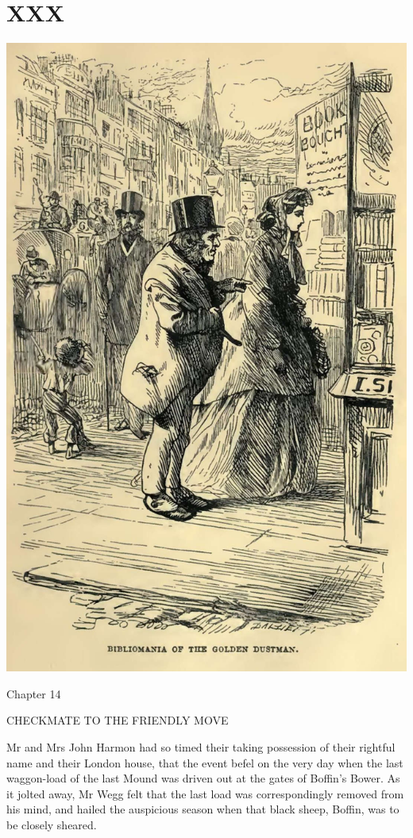 
\chapter{XXX}

\includegraphics[scale=2.3]{03-05-01}

Chapter 14

CHECKMATE TO THE FRIENDLY MOVE


Mr and Mrs John Harmon had so timed their taking possession of their
rightful name and their London house, that the event befel on the very
day when the last waggon-load of the last Mound was driven out at the
gates of Boffin’s Bower. As it jolted away, Mr Wegg felt that the
last load was correspondingly removed from his mind, and hailed the
auspicious season when that black sheep, Boffin, was to be closely
sheared.

